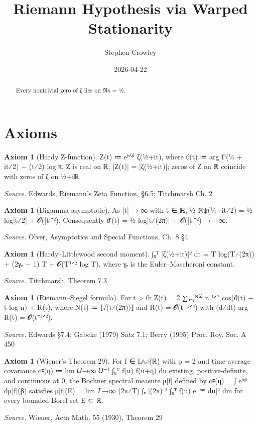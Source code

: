 \documentclass[11pt]{article}
\title{Riemann Hypothesis via Warped Stationarity}
\author{Stephen Crowley}
\date{2026-04-22}
\theoremstyle{definition}
\newtheorem{axiom}[theorem]{Axiom}
\begin{document}
\maketitle

\begin{abstract}
Every nontrivial zero of ζ lies on ℜs = ½.
\end{abstract}

\section*{Axioms}
\begin{axiom}[{Hardy Z-function}]\label{node-ax-Z}
Z(t) ≔ eⁱᵛ⁽ᵗ⁾ ζ(½+it), where ϑ(t) ≔ arg Γ(¼ + it⁄2) − (t⁄2) log π. Z is real on ℝ; |Z(t)| = |ζ(½+it)|; zeros of Z on ℝ coincide with zeros of ζ on ½+iℝ.
\end{axiom}
\noindent\textit{Source.} Edwards, Riemann's Zeta Function, §6.5; Titchmarsh Ch. 2

\begin{axiom}[{Digamma asymptotic}]\label{node-ax-ψasymp}
As |t| → ∞ with t ∈ ℝ, ½ ℜψ(¼+it⁄2) = ½ log|t⁄2| + 𝓞(|t|⁻²). Consequently ϑ′(t) = ½ log|t⁄(2π)| + 𝓞(|t|⁻²) → +∞.
\end{axiom}
\noindent\textit{Source.} Olver, Asymptotics and Special Functions, Ch. 8 §4

\begin{axiom}[{Hardy–Littlewood second moment}]\label{node-ax-HL}
∫₀ᵀ |ζ(½+it)|² dt = T log(T⁄(2π)) + (2γₑ − 1) T + 𝓞(T¹ᐟ² log T), where γₑ is the Euler–Mascheroni constant.
\end{axiom}
\noindent\textit{Source.} Titchmarsh, Theorem 7.3

\begin{axiom}[{Riemann–Siegel formula}]\label{node-ax-RS}
For t > 0: Z(t) = 2 ∑ₙ₌₁ᴺ⁽ᵗ⁾ n⁻¹ᐟ² cos(ϑ(t) − t log n) + R(t), where N(t) ≔ ⌊√(t⁄(2π))⌋ and R(t) = 𝓞(t⁻¹ᐟ⁴) with (d⁄dt) arg R(t) = 𝓞(t⁻¹ᐟ²).
\end{axiom}
\noindent\textit{Source.} Edwards §7.4; Gabcke (1979) Satz 7.1; Berry (1995) Proc. Roy. Soc. A 450

\begin{axiom}[{Wiener's Theorem 29}]\label{node-ax-Wiener29}
For f ∈ Lᵖₗₒᶜ(ℝ) with p = 2 and time-average covariance cꜰ(η) ≔ lim 𝑈→∞ 𝑈⁻¹ ∫₀ᵁ f(u) f̄(u+η) du existing, positive-definite, and continuous at 0, the Bochner spectral measure μ[f] defined by cꜰ(η) = ∫ eⁱᵑᵝ dμ[f](β) satisfies μ[f](E) = lim 𝑇→∞ (2π⁄T) ∫ₑ |(2π)⁻¹ ∫₀ᵀ f(u) e⁻ⁱᵐᵘ du|² dm for every bounded Borel set E ⊂ ℝ.
\end{axiom}
\noindent\textit{Source.} Wiener, Acta Math. 55 (1930), Theorem 29
\end{document}

